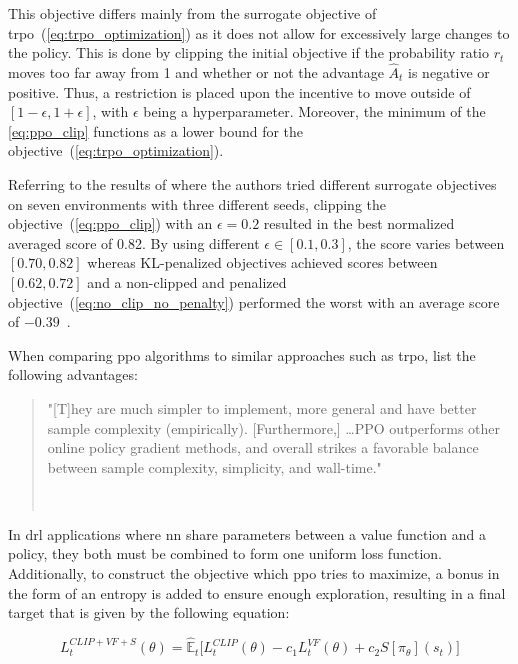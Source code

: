 \documentclass[draft,final]{vutinfth} %
\newcommand{\pautoref}[1]{(\autoref{#1})}
\newcommand{\p}[1]{see p. #1}
\begin{document}
    This objective differs mainly from the surrogate objective of \gls{trpo}~\pautoref{eq:trpo_optimization} as it does not allow for excessively large changes to the policy.
    This is done by clipping the initial objective if the probability ratio $r_t$ moves too far away from 1 and whether or not the advantage $\hat{A}_t$ is negative or positive.
    Thus, a restriction is placed upon the incentive to move outside of $[1-\epsilon,1+\epsilon]$, with $\epsilon$ being a hyperparameter.
    Moreover, the minimum of the \autoref{eq:ppo_clip} functions as a lower bound for the objective~\pautoref{eq:trpo_optimization}.

    Referring to the results of \citeauthor{francois-lavet_introduction_2018} where the authors tried different surrogate objectives on seven environments with three different seeds, clipping the objective~\pautoref{eq:ppo_clip} with an $\epsilon=0.2$ resulted in the best normalized averaged score of 0.82.
    By using different $\epsilon \in [0.1,0.3]$, the score varies between $[0.70,0.82]$ whereas KL-penalized objectives achieved scores between $[0.62,0.72]$ and a non-clipped and penalized objective~\pautoref{eq:no_clip_no_penalty} performed the worst with an average score of $-0.39$~\citep[see Table 1]{francois-lavet_introduction_2018}.

    When comparing \gls{ppo} algorithms to similar approaches such as \gls{trpo}, \citeauthor{francois-lavet_introduction_2018} list the following advantages:

    \begin{quote}
        "[T]hey are much simpler to implement, more general and have better sample complexity (empirically). [Furthermore,] \ldots PPO outperforms other online policy gradient methods, and overall strikes a favorable balance between sample complexity, simplicity, and wall-time."

        \hfill ~\citep[\p{1}]{francois-lavet_introduction_2018}
    \end{quote}

    In \gls{drl} applications where \gls{nn} share parameters between a value function and a policy, they both must be combined to form one uniform loss function.
    Additionally, to construct the objective which \gls{ppo} tries to maximize, a bonus in the form of an entropy is added to ensure enough exploration, resulting in a final target that is given by the following equation:

    \begin{equation}
        L_t^{CLIP+VF+S}(\theta) = \hat{\mathbb{E}}_t\bigg[L_t^{CLIP}(\theta) - c_1L_t^{VF}(\theta) + c_2S[\pi_\theta](s_t)\bigg]\label{eq:ppo_objective}
    \end{equation}
\end{document}
